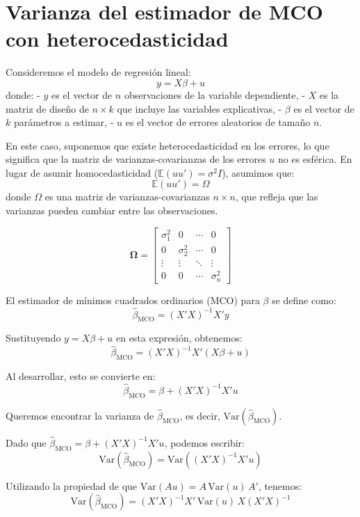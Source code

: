\documentclass{article}
\begin{document}
\section*{Varianza del estimador de MCO con  heterocedasticidad}

Consideremos el modelo de regresión lineal:
\[
y = X \beta + u
\]
donde:
- \( y \) es el vector de \( n \) observaciones de la variable dependiente,
- \( X \) es la matriz de diseño de \( n \times k \) que incluye las variables explicativas,
- \( \beta \) es el vector de \( k \) parámetros a estimar,
- \( u \) es el vector de errores aleatorios de tamaño \( n \).

En este caso, suponemos que existe heterocedasticidad en los errores, lo que significa que la matriz de varianzas-covarianzas de los errores \( u \) no es esférica. En lugar de asumir homocedasticidad (\( \mathbb{E}(uu') = \sigma^2 I \)), asumimos que:
\[
\mathbb{E}(uu') = \Omega
\]
donde \( \Omega \) es una matriz de varianzas-covarianzas \( n \times n \), que refleja que las varianzas pueden cambiar entre las observaciones.

\[
\boldsymbol{\Omega} =
\begin{bmatrix}
\sigma_1^2 & 0 & \cdots & 0 \\
0 & \sigma_2^2 & \cdots & 0 \\
\vdots & \vdots & \ddots & \vdots \\
0 & 0 & \cdots & \sigma_n^2
\end{bmatrix}
\]

El estimador de mínimos cuadrados ordinarios (MCO) para \( \beta \) se define como:
\[
\hat{\beta}_{\text{MCO}} = (X'X)^{-1} X'y
\]

Sustituyendo \( y = X \beta + u \) en esta expresión, obtenemos:
\[
\hat{\beta}_{\text{MCO}} = (X'X)^{-1} X'(X \beta + u)
\]

Al desarrollar, esto se convierte en:
\[
\hat{\beta}_{\text{MCO}} = \beta + (X'X)^{-1} X'u
\]


Queremos encontrar la varianza de \( \hat{\beta}_{\text{MCO}} \), es decir, \( \text{Var}(\hat{\beta}_{\text{MCO}}) \).

Dado que \( \hat{\beta}_{\text{MCO}} = \beta + (X'X)^{-1} X'u \), podemos escribir:
\[
\text{Var}(\hat{\beta}_{\text{MCO}}) = \text{Var}((X'X)^{-1} X'u)
\]

Utilizando la propiedad de que \( \text{Var}(A u) = A \, \text{Var}(u) \, A' \), tenemos:
\[
\text{Var}(\hat{\beta}_{\text{MCO}}) = (X'X)^{-1} X' \, \text{Var}(u) \, X (X'X)^{-1}
\]
\end{document}
